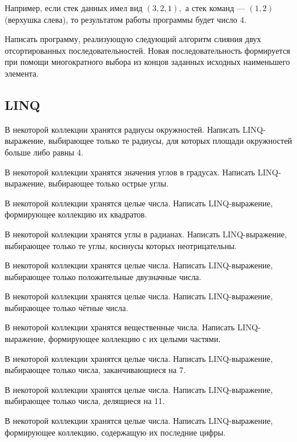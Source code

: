 Например, если стек данных имел вид $(3, 2, 1),$ а стек команд —
$(1, 2)$ (верхушка слева), то результатом работы программы будет число
$4$.

\task Написать программу, реализующую следующий алгоритм слияния двух
отсортированных последовательностей. Новая последовательность
формируется при помощи многократного выбора из концов заданных
исходных наименьшего элемента.


\subsection{LINQ}

\task В некоторой коллекции хранятся радиусы окружностей. Написать
LINQ-выражение, выбирающее только те радиусы, для которых площади
окружностей больше либо равны 4.

\task В некоторой коллекции хранятся значения углов в
градусах. Написать LINQ-выражение, выбирающее только острые углы.

\task В некоторой коллекции хранятся целые числа. Написать
LINQ-выражение, формирующее коллекцию их квадратов.

\task В некоторой коллекции хранятся углы в радианах. Написать
LINQ-выражение, выбирающее только те углы, косинусы которых
неотрицательны.

\task В некоторой коллекции хранятся целые числа. Написать
LINQ-выражение, выбирающее только положительные двузначные числа.

\task В некоторой коллекции хранятся целые числа. Написать
LINQ-выражение, выбирающее только чётные числа.

\task В некоторой коллекции хранятся вещественные числа. Написать
LINQ-выражение, формирующее коллекцию с их целыми частями.

\task В некоторой коллекции хранятся целые числа. Написать
LINQ-выражение, выбирающее только числа, заканчивающиеся на 7.

\task В некоторой коллекции хранятся целые числа. Написать
LINQ-выражение, выбирающее только числа, делящиеся на 11.

\task В некоторой коллекции хранятся целые числа. Написать
LINQ-выражение, формирующее коллекцию, содержащую их последние цифры.
